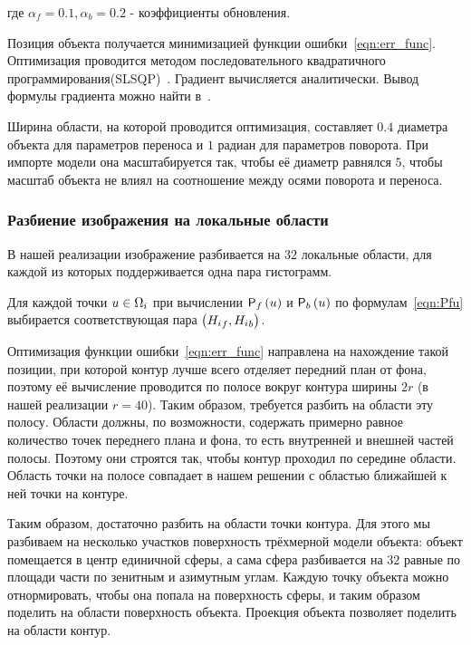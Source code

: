 где $\alpha_f = 0.1, \alpha_b = 0.2$ - коэффициенты обновления.

Позиция объекта получается минимизацией функции ошибки~\ref{eqn:err_func}.
Оптимизация проводится методом последовательного квадратичного
программирования(SLSQP)~\cite{SLSQP}.
Градиент вычисляется аналитически.
Вывод формулы градиента можно найти в~\cite{Tjaden2018}.

Ширина области, на которой проводится оптимизация, составляет $0.4$ диаметра
объекта для параметров переноса и $1$ радиан для параметров поворота.
При импорте модели она масштабируется так, чтобы её диаметр равнялся $5$,
чтобы масштаб объекта не влиял на соотношение между осями поворота и переноса.



\subsubsection*{Разбиение изображения на локальные области}

В нашей реализации изображение разбивается на $32$ локальные области, для
каждой из
которых поддерживается одна пара гистограмм.

Для каждой точки $\mathnormal{u} \in \Omega_i$ при вычислении $\mathsf{P}_f \left( \mathnormal{u} \right)$ и
$\mathsf{P}_b \left( \mathnormal{u} \right)$ по
формулам~\ref{eqn:Pfu} выбирается соответствующая пара $\left( {H_i}_f,
{H_i}_b \right)$.

Оптимизация функции ошибки~\ref{eqn:err_func} направлена на нахождение такой
позиции, при которой контур лучше всего отделяет передний план от фона, поэтому
её вычисление проводится по полосе вокруг контура ширины $2r$ (в нашей
реализации $r = 40$).
Таким образом, требуется разбить на области эту полосу.
Области должны, по возможности, содержать примерно равное количество точек
переднего плана и фона, то есть внутренней и внешней частей полосы.
Поэтому они строятся так, чтобы контур проходил по середине
области.
Область точки на полосе совпадает в нашем решении с областью ближайшей к ней
точки на контуре.

Таким образом, достаточно разбить на области точки контура.
Для этого мы разбиваем на несколько участков поверхность трёхмерной модели
объекта: объект помещается в центр единичной сферы, а сама сфера разбивается
на $32$ равные по площади части по зенитным и азимутным углам.
Каждую точку объекта можно отнормировать, чтобы она попала на поверхность
сферы, и таким образом поделить на области поверхность объекта.
Проекция объекта позволяет поделить на области контур.

